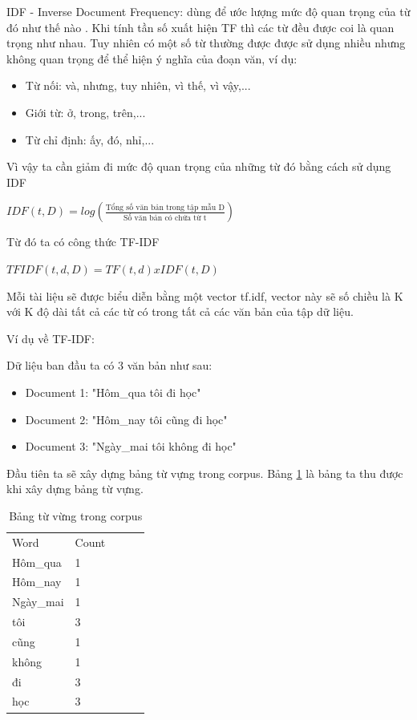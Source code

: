 IDF - Inverse Document Frequency: dùng để ước lượng mức độ quan trọng của từ đó như thế nào . Khi tính tần số xuất hiện TF thì các từ đều được coi là quan trọng như nhau. Tuy nhiên có một số từ thường được được sử dụng nhiều nhưng không quan trọng để thể hiện ý nghĩa của đoạn văn, ví dụ:
\begin{itemize}
    \item Từ nối: và, nhưng, tuy nhiên, vì thế, vì vậy,...
    \item Giới từ: ở, trong, trên,...
    \item Từ chỉ định: ấy, đó, nhỉ,...
\end{itemize}

Vì vậy ta cần giảm đi mức độ quan trọng của những từ đó bằng cách sử dụng IDF

\begin{center}
    \(IDF(t, D) = log(\frac{\text{Tổng số văn bản trong tập mẫu D}}{\text{Số văn bản có chứa từ t}})\)
\end{center}

Từ đó ta có công thức TF-IDF

\begin{center}
    \(TFIDF(t, d, D) = TF(t, d) x IDF(t, D)\)
\end{center}

Mỗi tài liệu sẽ được biểu diễn bằng một vector tf.idf, vector này sẽ số chiều là K với K độ dài tất cả các từ có trong tất cả các văn bản của tập dữ liệu.

Ví dụ về TF-IDF:

Dữ liệu ban đầu ta có 3 văn bản như sau:
\begin{itemize}
    \item Document 1: "Hôm\_qua tôi đi học"
    \item Document 2: "Hôm\_nay tôi cũng đi học"
    \item Document 3: "Ngày\_mai tôi không đi học"
\end{itemize}

Đầu tiên ta sẽ xây dựng bảng từ vựng trong corpus. Bảng \ref{tab:sec3exmptfidf} là bảng ta thu được khi xây dựng bảng từ vựng.
\begin{table}[h!]
\centering
\begin{tabular}{|l|l|lll}
\cline{1-2}
Word  & Count &  &  &  \\ \cline{1-2}
Hôm\_qua & 1     &  &  &  \\ \cline{1-2}
Hôm\_nay    & 1     &  &  &  \\ \cline{1-2}
Ngày\_mai & 1     &  &  &  \\ \cline{1-2}
tôi & 3     &  &  &  \\ \cline{1-2}
cũng & 1     &  &  &  \\ \cline{1-2}
không & 1     &  &  &  \\ \cline{1-2}
đi & 3     &  &  &  \\ \cline{1-2}
học & 3     &  &  &  \\ \cline{1-2}
\end{tabular}
\caption{Bảng từ vừng trong corpus}
\label{tab:sec3exmptfidf}
\end{table}

